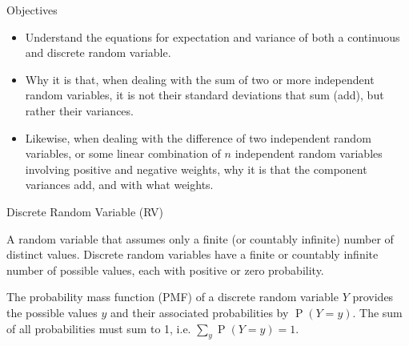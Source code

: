 \documentclass[10pt]{beamer}\usepackage[]{graphicx}\usepackage[]{color}
\newcommand{\Prob}{\operatorname{P}}
\begin{document}
\begin{frame}{Objectives}

	\begin{itemize}
			  \setlength{\itemsep}{10pt}		
		\item Understand the equations for expectation and variance of both a continuous and discrete random variable.
		
		\item Why it is that, when dealing with the sum  of two or more independent random variables, it is not their standard deviations that sum (add), but rather their variances.
		
		\item Likewise, when dealing with the difference  of two independent random variables, or some linear combination of $n$ independent random variables involving positive and negative weights, why it is that the component variances add, and with what weights. 
	\end{itemize}
	
\end{frame}


\begin{frame}{Discrete Random Variable (RV)}
	
\begin{definition}
A random variable that assumes only a finite (or countably infinite) number of distinct values. Discrete random variables have a finite or countably infinite number of possible values, each with positive or zero probability.
\end{definition}

\pause

\begin{definition}
The probability mass function (PMF) of a discrete random variable $Y$ provides the possible values $y$ and their associated probabilities by $\Prob(Y=y)$. The sum of all probabilities must sum to 1, i.e. $\sum_{y} \Prob(Y=y) = 1$. 
\end{definition}
	

\end{frame}
\end{document}
